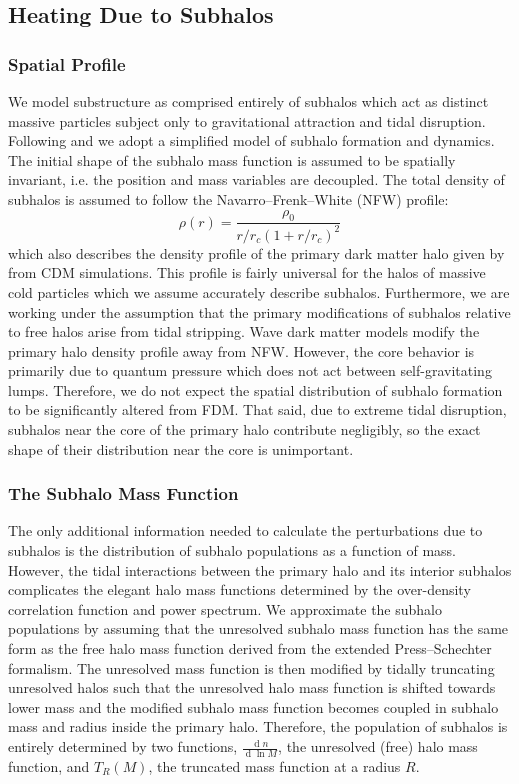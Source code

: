 \documentclass[usenatbib]{mnras}
\renewcommand{\d}[1]{\! \mathrm{d}#1 \:}
\renewcommand{\d}[1]{\ensuremath{\operatorname{d}\!{#1}}}
\begin{document}
\subsection{Heating Due to Subhalos}

\subsubsection{Spatial Profile}

	We model substructure as comprised entirely of subhalos which act as distinct massive particles subject only to gravitational attraction and tidal disruption. Following \citet{tidal_limit} and \cite{unified_model} we adopt a
simplified model of subhalo
formation and dynamics. The initial shape of
the subhalo mass function is assumed to
be spatially invariant, i.e. the position
and mass variables are decoupled. The
total density of subhalos is assumed to
follow the Navarro--Frenk--White (NFW) profile:
\begin{equation}
\rho(r) = \frac{\rho_0}{r/r_c (1+r/r_c)^2}
\end{equation} which also
describes the density profile of the
primary dark matter halo given by \citet{structure} from CDM simulations. This profile is fairly universal for the halos of massive cold particles which we assume accurately describe subhalos. Furthermore, we are working under the assumption that the primary modifications of subhalos relative to free halos arise from tidal stripping. Wave dark matter models modify the primary halo density profile away from NFW. However, the core behavior is primarily due to quantum pressure which does not act between self-gravitating lumps. Therefore, we do not expect the spatial distribution of subhalo formation to be significantly altered from FDM. That said, due to extreme tidal disruption, subhalos near the core of the primary halo contribute negligibly, so the exact shape of their distribution near the core is unimportant.  

\subsubsection{The Subhalo Mass Function}

The only additional information needed to calculate the perturbations due to subhalos is the distribution of subhalo populations as a function of mass. However, the tidal interactions between the primary halo and its interior subhalos complicates the elegant halo mass functions determined by the over-density correlation function and power spectrum. We approximate the subhalo populations by assuming that the unresolved subhalo mass function has the same form as the free halo mass function derived from the extended Press--Schechter formalism. The unresolved mass function is then modified by tidally truncating unresolved halos such that the unresolved halo mass function is shifted towards lower mass and the modified subhalo mass function becomes coupled in subhalo mass and radius inside the primary halo. Therefore, the population of subhalos is entirely determined by two functions, $\frac{\d{n}}{\d{\ln{M}}}$, the unresolved (free) halo mass function, and $T_R(M)$, the truncated mass function at a radius $R$.
\end{document}
